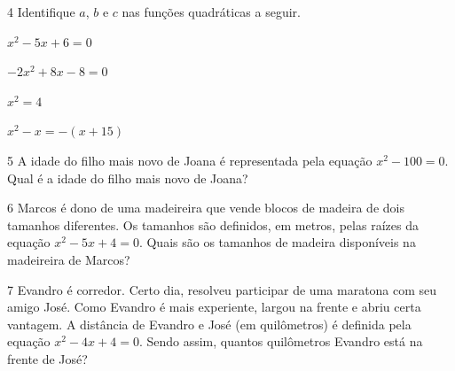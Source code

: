 {{


\num{4} Identifique $a$, $b$ e $c$ nas funções quadráticas a seguir.

\begin{escolha}[itemsep=0pt]
\item $x^2 - 5x + 6 = 0$
\item $-2x^2 + 8x - 8 = 0$
\item $x^2 = 4$
\item $x^2 - x = -(x + 15)$
\end{escolha}





\num{5} A idade do filho mais novo de Joana é representada pela equação $x^2 -
100 = 0$. Qual é a idade do filho mais novo de Joana?









\num{6} Marcos é dono de uma madeireira que vende blocos de madeira de dois
tamanhos diferentes. Os tamanhos são definidos, em metros, pelas raízes
da equação $x^2 - 5x + 4 = 0$. Quais são os tamanhos de madeira disponíveis
na madeireira de Marcos?






\num{7} Evandro é corredor. Certo dia, resolveu participar de uma maratona
com seu amigo José. Como Evandro é mais experiente, largou na frente e
abriu certa vantagem. A distância de Evandro e José (em quilômetros) é definida
pela equação $x^2 - 4x + 4 = 0$. Sendo assim, quantos quilômetros Evandro está na
frente de José?

}}
